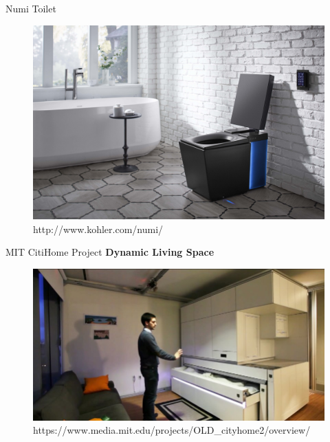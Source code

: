 \documentclass[10pt]{beamer}
\begin{document}
\begin{frame}{Numi Toilet}
	\begin{figure}[H]
	\includegraphics[width=\textwidth]{images/6.jpg}
	\caption{http://www.kohler.com/numi/}
	\end{figure}
\end{frame}

\begin{frame}{MIT CitiHome Project}
	\textbf{Dynamic Living Space}\\
	\vspace{3mm}
	\begin{figure}[H]
	\includegraphics[width=\textwidth]{images/4.jpg}
	\caption{https://www.media.mit.edu/projects/OLD\_cityhome2/overview/}
	\end{figure}
\end{frame}
\end{document}
